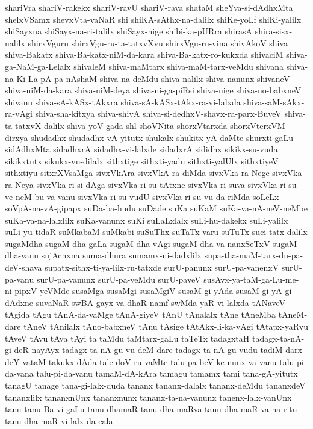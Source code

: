 {shariVra
shariV-rakekx
shariV-ravU
shariV-rava
shataM
sheYva-si-dAdhxMta
shelxVSamx
shevxVta-vaNaR
shi
shiKA-sAthx-na-dalilx
shiKe-yoLf
shiKi-yalilx
shiSayxna
shiSayx-na-ri-talilx
shiSayx-nige
shibi-ka-pURra
shirasA
shira-sisx-nalilx
shirxVguru
shirxVgu-ru-ta-tatxvXvu
shirxVgu-ru-vina
shivAkoV
shiva
shiva-Bakatx
shiva-Ba-katx-niM-da-kara
shiva-Ba-katx-ro-kukxda
shivaciM
shiva-ga-NaM-ga-Lelalx
shivaleM
shiva-maMtarx
shiva-maM-tarx-veMdu
shivana
shiva-na-Ki-La-pA-pa-nAshaM
shiva-na-deMdu
shiva-nalilx
shiva-nanunx
shivaneV
shiva-niM-da-kara
shiva-niM-deya
shiva-ni-ga-piRsi
shiva-nige
shiva-no-babxneV
shivanu
shiva-sA-kASx-tAkxra
shiva-sA-kASx-tAkx-ra-vi-lalxda
shiva-saM-sAkx-ra-vAgi
shiva-sha-kitxya
shiva-shivA
shiva-si-dedhxV-shavx-ra-parx-BuveV
shiva-ta-tatxvX-dalilx
shiva-yoV-gada
shl
shoVNita
shorxVtarxda
shorxVterxVM-dirxya
shudadhx
shudadhx-vA-yitutx
shukalx
shukitx-yA-daMte
shurxti-gaLu
sidAdhxMta
sidadhxrA
sidadhx-vi-lalxde
sidadxrA
sididhx
sikikx-su-vuda
sikikxtutx
sikukx-vu-dilalx
sithxtige
sithxti-yadu
sithxti-yalUlx
sithxtiyeV
sithxtiyu
sitxrXVsaMga
sivxVkAra
sivxVkA-ra-diMda
sivxVka-ra-Nege
sivxVka-ra-Neya
sivxVka-ri-si-dAga
sivxVka-ri-su-tAtxne
sivxVka-ri-suva
sivxVka-ri-su-ve-neM-bu-va-vanu
sivxVka-ri-su-vudU
sivxVka-ri-su-vu-da-riMda
soLeLx
soVpA-na-vA-gipapx
suDa-ba-hudu
suDade
suKa
suKaM
suKa-va-nA-neV-neMbe
suKa-va-na-lalxlilx
suKa-vanunx
suKi
suLaLxlalx
suLi-hu-dakekx
suLi-yalilx
suLi-yu-tidaR
suMkabaM
suMkabi
suSuThx
suTaTx-varu
suTuTx
suci-tatx-dalilx
sugaMdha
sugaM-dha-gaLa
sugaM-dha-vAgi
sugaM-dha-va-nanxSeTxV
sugaM-dha-vanu
sujAcnxna
suma-dhura
sumamx-ni-dadxlilx
supa-tha-maM-tarx-du-pa-deV-shava
supatx-sithx-ti-ya-lilx-ru-tatxde
surU-panunx
surU-pa-vanenxV
surU-pa-vanu
surU-pa-vanunx
surU-pa-veMdu
surU-paveV
susAvx-ya-taM-ga-Lu-me-ni-pipxV-yeVMde
susaMga
susaMgi
susaMgiV
susaM-gi-yAda
susaM-gi-yA-gi-dAdxne
suvaNaR
swBA-gayx-va-dhaR-namf
swMda-yaR-vi-lalxda
tANaveV
tAgida
tAgu
tAnA-da-vaMge
tAnA-giyeV
tAnU
tAnalalx
tAne
tAneMba
tAneM-dare
tAneV
tAnilalx
tAno-babxneV
tAnu
tAsige
tAtAkx-li-ka-vAgi
tAtapx-yaRvu
tAveV
tAvu
tAya
tAyi
ta
taMdu
taMtarx-gaLu
taTeTx
tadagxtaH
tadagx-ta-nA-gi-deR-nayAyx
tadagx-ta-nA-gu-vu-deM-dare
tadagx-ta-nA-gu-vudu
tadiM-darx-deY-vataM
takukx-dAda
tale-doV-ru-vaMte
talu-pa-beV-ke-nunx-va-vanu
talu-pi-da-vana
talu-pi-da-vanu
tamaM-dA-kAra
tamagu
tamamx
tami
tana-gA-yitutx
tanagU
tanage
tana-gi-lalx-duda
tananx
tananx-dalalx
tananx-deMdu
tananxdeV
tananxlilx
tananxnUnx
tananxnunx
tananx-ta-na-vanunx
tanenx-lalx-vanUnx
tanu
tanu-Ba-vi-gaLu
tanu-dhamaR
tanu-dha-maRva
tanu-dha-maR-va-na-ritu
tanu-dha-maR-vi-lalx-da-cala
}
